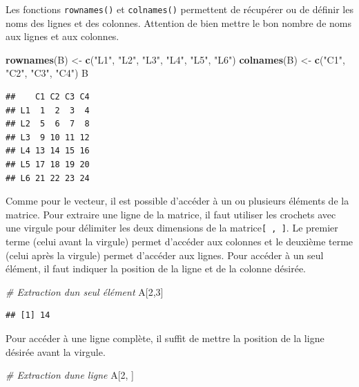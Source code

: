 \documentclass[
]{book}
\newenvironment{Shaded}{\begin{snugshade}}{\end{snugshade}}
\newcommand{\CommentTok}[1]{\textcolor[rgb]{0.56,0.35,0.01}{\textit{#1}}}
\newcommand{\DecValTok}[1]{\textcolor[rgb]{0.00,0.00,0.81}{#1}}
\newcommand{\FunctionTok}[1]{\textcolor[rgb]{0.13,0.29,0.53}{\textbf{#1}}}
\newcommand{\NormalTok}[1]{#1}
\newcommand{\OtherTok}[1]{\textcolor[rgb]{0.56,0.35,0.01}{#1}}
\newcommand{\StringTok}[1]{\textcolor[rgb]{0.31,0.60,0.02}{#1}}
\begin{document}
Les fonctions \texttt{rownames()} et \texttt{colnames()} permettent de récupérer ou de définir les noms des lignes et des colonnes. Attention de bien mettre le bon nombre de noms aux lignes et aux colonnes.

\begin{Shaded}
\begin{Highlighting}[]
\FunctionTok{rownames}\NormalTok{(B) }\OtherTok{\textless{}{-}} \FunctionTok{c}\NormalTok{(}\StringTok{"L1"}\NormalTok{, }\StringTok{"L2"}\NormalTok{, }\StringTok{"L3"}\NormalTok{, }\StringTok{"L4"}\NormalTok{, }\StringTok{"L5"}\NormalTok{, }\StringTok{"L6"}\NormalTok{)}
\FunctionTok{colnames}\NormalTok{(B) }\OtherTok{\textless{}{-}} \FunctionTok{c}\NormalTok{(}\StringTok{"C1"}\NormalTok{, }\StringTok{"C2"}\NormalTok{, }\StringTok{"C3"}\NormalTok{, }\StringTok{"C4"}\NormalTok{)}
\NormalTok{B}
\end{Highlighting}
\end{Shaded}

\begin{verbatim}
##    C1 C2 C3 C4
## L1  1  2  3  4
## L2  5  6  7  8
## L3  9 10 11 12
## L4 13 14 15 16
## L5 17 18 19 20
## L6 21 22 23 24
\end{verbatim}

Comme pour le vecteur, il est possible d'accéder à un ou plusieurs éléments de la matrice.
Pour extraire une ligne de la matrice, il faut utiliser les crochets avec une virgule pour délimiter les deux dimensions de la matrice\texttt{{[}\ ,\ {]}}. Le premier terme (celui avant la virgule) permet d'accéder aux colonnes et le deuxième terme (celui après la virgule) permet d'accéder aux lignes.
Pour accéder à un seul élément, il faut indiquer la position de la ligne et de la colonne désirée.

\begin{Shaded}
\begin{Highlighting}[]
\CommentTok{\# Extraction d\textquotesingle{}un seul élément}
\NormalTok{A[}\DecValTok{2}\NormalTok{,}\DecValTok{3}\NormalTok{]}
\end{Highlighting}
\end{Shaded}

\begin{verbatim}
## [1] 14
\end{verbatim}

Pour accéder à une ligne complète, il suffit de mettre la position de la ligne désirée avant la virgule.

\begin{Shaded}
\begin{Highlighting}[]
\CommentTok{\# Extraction d\textquotesingle{}une ligne}
\NormalTok{A[}\DecValTok{2}\NormalTok{, ]}
\end{Highlighting}
\end{Shaded}
\end{document}
